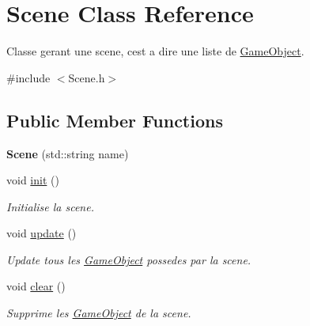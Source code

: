 \hypertarget{class_scene}{}\section{Scene Class Reference}
\label{class_scene}


Classe gerant une scene, c\textquotesingle{}est a dire une liste de \hyperlink{class_game_object}{Game\+Object}.  




{\ttfamily \#include $<$Scene.\+h$>$}

\subsection*{Public Member Functions}
\begin{DoxyCompactItemize}
\item 
\hypertarget{class_scene_a6fb788d6ae25d5293d3a58966cf29757}{}\label{class_scene_a6fb788d6ae25d5293d3a58966cf29757} 
{\bfseries Scene} (std\+::string name)
\item 
\hypertarget{class_scene_abb3b6efc6fdba03cd96436edaf08a967}{}\label{class_scene_abb3b6efc6fdba03cd96436edaf08a967} 
void \hyperlink{class_scene_abb3b6efc6fdba03cd96436edaf08a967}{init} ()
\begin{DoxyCompactList}\small\item\em Initialise la scene. \end{DoxyCompactList}\item 
\hypertarget{class_scene_aa24c7e636c10e4e42650c1374b90bb80}{}\label{class_scene_aa24c7e636c10e4e42650c1374b90bb80} 
void \hyperlink{class_scene_aa24c7e636c10e4e42650c1374b90bb80}{update} ()
\begin{DoxyCompactList}\small\item\em Update tous les \hyperlink{class_game_object}{Game\+Object} possedes par la scene. \end{DoxyCompactList}\item 
\hypertarget{class_scene_a70e5b1218abb729d70d9f41b107017f9}{}\label{class_scene_a70e5b1218abb729d70d9f41b107017f9} 
void \hyperlink{class_scene_a70e5b1218abb729d70d9f41b107017f9}{clear} ()
\begin{DoxyCompactList}\small\item\em Supprime les \hyperlink{class_game_object}{Game\+Object} de la scene. \end{DoxyCompactList}\item 
\hypertarget{class_scene_a95d3218f52081eea9e34d2d2bdff94df}{}\label{class_scene_a95d3218f52081eea9e34d2d2bdff94df} 

\end{DoxyCompactItemize}
